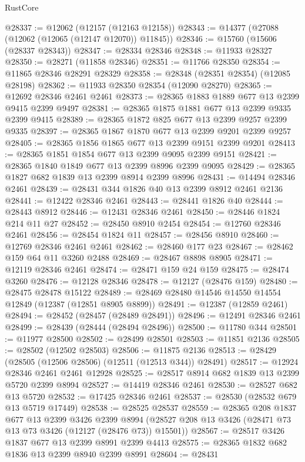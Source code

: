 \begin{lexlean}{RustCore}
\begin{coremodule}
@28337 := @12062 (@12157 (@12163 @12158))
@28343 := @14377 (@27088 (@12062 (@12065 (@12147 @12070)) @11845))
@28346 := @15760 (@15606 (@28337 @28343))
@28347 := @28334 @28346
@28348 := @11933 @28327
@28350 := @28271 (@11858 @28346)
@28351 := @11766 @28350
@28354 := @11865 @28346 @28291 @28329
@28358 := @28348 (@28351 @28354) (@12085 @28198)
@28362 := @11933 @28350 @28354 (@12090 @28270)
@28365 := @12692 @28346 @2461 @2461
@28373 := @28365 @1883 @1889 @677 @13 @2399 @9415 @2399 @9497
@28381 := @28365 @1875 @1881 @677 @13 @2399 @9335 @2399 @9415
@28389 := @28365 @1872 @825 @677 @13 @2399 @9257 @2399 @9335
@28397 := @28365 @1867 @1870 @677 @13 @2399 @9201 @2399 @9257
@28405 := @28365 @1856 @1865 @677 @13 @2399 @9151 @2399 @9201
@28413 := @28365 @1851 @1854 @677 @13 @2399 @9095 @2399 @9151
@28421 := @28365 @1840 @1849 @677 @13 @2399 @8996 @2399 @9095
@28429 := @28365 @1827 @682 @1839 @13 @2399 @8914 @2399 @8996
@28431 := @14494 @28346 @2461
@28439 := @28431 @344 @1826 @40 @13 @2399 @8912 @2461 @2136
@28441 := @12422 @28346 @2461
@28443 := @28441 @1826 @40
@28444 := @28443 @8912
@28446 := @12431 @28346 @2461
@28450 := @28446 @1824 @214 @11 @27
@28452 := @28450 @8910 @2454
@28454 := @12760 @28346 @2461
@28456 := @28454 @1824 @11
@28457 := @28456 @8910
@28460 := @12769 @28346 @2461 @2461
@28462 := @28460 @177 @23
@28467 := @28462 @159 @64 @11 @3260 @2488
@28469 := @28467 @8898 @8905
@28471 := @12119 @28346 @2461
@28474 := @28471 @159 @24 @159
@28475 := @28474 @3260
@28476 := @12128 @28346
@28478 := @12127 (@28476 @159)
@28480 := @28475 @28478 @15122
@28489 := @28469 @28480 @14546 @14550 @14554 @12849 (@12387 (@12851 @8905 @8899))
@28491 := @12387 (@12859 @2461)
@28494 := @28452 (@28457 (@28489 @28491))
@28496 := @12491 @28346 @2461
@28499 := @28439 (@28444 (@28494 @28496))
@28500 := @11780 @344
@28501 := @11977 @28500
@28502 := @28499 @28501
@28503 := @11851 @2136
@28505 := @28502 (@12502 @28503)
@28506 := @11875 @2136
@28513 := @28429 (@28505 (@12506 @28506) (@12511 (@12513 @344)) @28491)
@28517 := @12924 @28346 @2461 @2461 @12928
@28525 := @28517 @8914 @682 @1839 @13 @2399 @5720 @2399 @8994
@28527 := @14419 @28346 @2461
@28530 := @28527 @682 @13 @5720
@28532 := @17425 @28346 @2461
@28537 := @28530 (@28532 @679 @13 @5719 @17449)
@28538 := @28525 @28537
@28559 := @28365
    @208
    @1837
    @677
    @13
    @2399
    @3426
    @2399
    @8994
    (@28527 @208 @13 @3426 (@28471 @73 @13 @73 @3426 (@12127 (@28476 @73)) @15501))
@28567 := @28517 @3426 @1837 @677 @13 @2399 @8991 @2399 @4413
@28575 := @28365 @1832 @682 @1836 @13 @2399 @8940 @2399 @8991
@28604 := @28431

\end{coremodule}
\end{lexlean}
